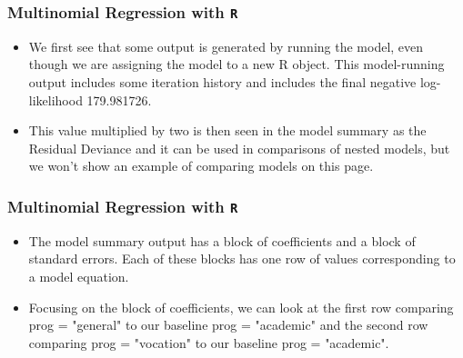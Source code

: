 \documentclass[00-GLMregslides.tex]{subfiles}
\begin{document}
\begin{frame}[fragile]

\frametitle{Multinomial Regression with \texttt{R}}
\Large
\begin{itemize}
\item We first see that some output is generated by running the model, even though we are assigning the model to a new R object. This model-running output includes some iteration history and includes the final negative log-likelihood 179.981726. 
\item This value multiplied by two is then seen in the model summary as the Residual Deviance and it can be used in comparisons of nested models, but we won't show an example of comparing models on this page.
\end{itemize}
\end{frame}

\begin{frame}[fragile]
	
	\frametitle{Multinomial Regression with \texttt{R}}
	\Large
	\begin{itemize}




\item The model summary output has a block of coefficients and a block of standard errors. Each of these blocks has one row of values corresponding to a model equation. 
\item Focusing on the block of coefficients, we can look at the first row comparing prog = "general" to our baseline prog = "academic" and the second row comparing prog = "vocation" to our baseline prog = "academic". 
\end{itemize}
\end{frame}
\end{document}
